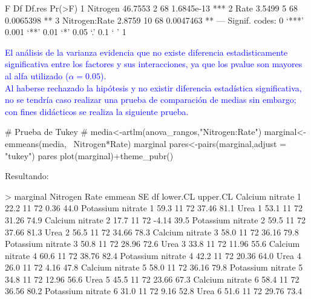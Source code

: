 \documentclass[a4paper,12pt]{article}
\begin{document}
\begin{enumerate}[label=\textbf{\alph*})]
\begin{MyVerbatim}
F Df Df.res     Pr(>F)    
1 Nitrogen      46.7553  2     68 1.6845e-13 ***
2 Rate           3.5499  5     68  0.0065398  **
3 Nitrogen:Rate  2.8759 10     68  0.0047463  **
---
Signif. codes:   0 ‘***’ 0.001 ‘**’ 0.01 ‘*’ 0.05 ‘.’ 0.1 ‘ ’ 1 
\end{MyVerbatim}
\textcolor{blue}{El análisis de la varianza evidencia que no existe diferencia estadisticamente significativa entre los factores y sus interacciones, ya que los pvalue son mayores al alfa utilizado (\(\alpha=0.05\)).\\
Al haberse rechazado la hipótesis y no existir diferencia estadística significativa, no se tendría caso realizar una prueba de comparación de medias
sin embargo; con fines didácticos se realiza la siguiente prueba.}
\begin{MyVerbatim}
# Prueba de Tukey #
media<-artlm(anova_rangos,"Nitrogen:Rate")
marginal<-emmeans(media, ~Nitrogen*Rate)
marginal
pares<-pairs(marginal,adjust = "tukey")
pares
plot(marginal)+theme_pubr()
\end{MyVerbatim}
Resultando:
\begin{MyVerbatim}
> marginal
Nitrogen          Rate emmean SE df lower.CL upper.CL
Calcium nitrate   1      22.2 11 72     0.36     44.0
Potassium nitrate 1      59.3 11 72    37.46     81.1
Urea              1      53.1 11 72    31.26     74.9
Calcium nitrate   2      17.7 11 72    -4.14     39.5
Potassium nitrate 2      59.5 11 72    37.66     81.3
Urea              2      56.5 11 72    34.66     78.3
Calcium nitrate   3      58.0 11 72    36.16     79.8
Potassium nitrate 3      50.8 11 72    28.96     72.6
Urea              3      33.8 11 72    11.96     55.6
Calcium nitrate   4      60.6 11 72    38.76     82.4
Potassium nitrate 4      42.2 11 72    20.36     64.0
Urea              4      26.0 11 72     4.16     47.8
Calcium nitrate   5      58.0 11 72    36.16     79.8
Potassium nitrate 5      34.8 11 72    12.96     56.6
Urea              5      45.5 11 72    23.66     67.3
Calcium nitrate   6      58.4 11 72    36.56     80.2
Potassium nitrate 6      31.0 11 72     9.16     52.8
Urea              6      51.6 11 72    29.76     73.4


\end{MyVerbatim}
\end{enumerate}
\end{document}
